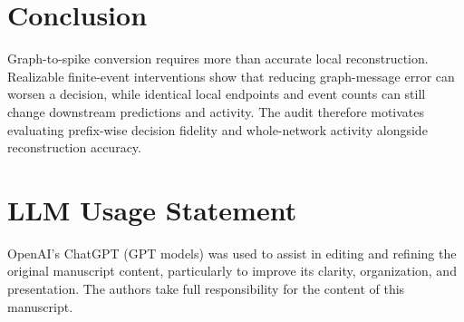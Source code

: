 \documentclass[10pt,twocolumn,letterpaper]{article}
\begin{document}
\section{Conclusion}
Graph-to-spike conversion requires more than accurate local reconstruction. Realizable finite-event interventions show that reducing graph-message error can worsen a decision, while identical local endpoints and event counts can still change downstream predictions and activity. The audit therefore motivates evaluating prefix-wise decision fidelity and whole-network activity alongside reconstruction accuracy.

\clearpage
\section*{LLM Usage Statement}
OpenAI's ChatGPT (GPT models) was used to assist in editing and refining the original manuscript content, particularly to improve its clarity, organization, and presentation. The authors take full responsibility for the content of this manuscript.

\setlength{\bibsep}{0pt}
\fontsize{8.5}{9.5}\selectfont
{}


\end{document}
